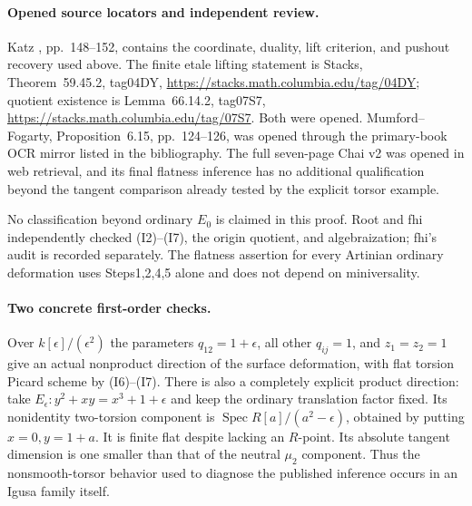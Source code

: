 \paragraph{Opened source locators and independent review.}
Katz \cite{DGJ_Katz1981}, pp.~148--152, contains the coordinate,
duality, lift criterion, and pushout recovery used above. The finite
etale lifting statement is Stacks, Theorem~59.45.2, tag04DY,
\url{https://stacks.math.columbia.edu/tag/04DY}; quotient existence is
Lemma~66.14.2, tag07S7,
\url{https://stacks.math.columbia.edu/tag/07S7}. Both were opened.
Mumford--Fogarty, Proposition~6.15, pp.~124--126, was opened through
the primary-book OCR mirror listed in the bibliography.
The full seven-page Chai v2 was opened in web retrieval, and its final
flatness inference has no additional qualification beyond the tangent
comparison already tested by the explicit torsor example.

No classification beyond ordinary $E_0$ is claimed in this proof. Root and fhi independently checked (I2)--(I7), the origin quotient, and algebraization; fhi's audit is recorded separately. The flatness assertion for every Artinian ordinary deformation uses Steps1,2,4,5 alone and does not depend on miniversality.

\paragraph{Two concrete first-order checks.}
Over $k[\epsilon]/(\epsilon^2)$ the parameters $q_{12}=1+\epsilon$, all other $q_{ij}=1$, and $z_1=z_2=1$ give an actual nonproduct direction of the surface deformation, with flat torsion Picard scheme by (I6)--(I7). There is also a completely explicit product direction: take $E_\epsilon:y^2+xy=x^3+1+\epsilon$ and keep the ordinary translation factor fixed. Its nonidentity two-torsion component is $\operatorname{Spec}R[a]/(a^2-\epsilon)$, obtained by putting $x=0,y=1+a$. It is finite flat despite lacking an $R$-point. Its absolute tangent dimension is one smaller than that of the neutral $\mu_2$ component. Thus the nonsmooth-torsor behavior used to diagnose the published inference occurs in an Igusa family itself.
